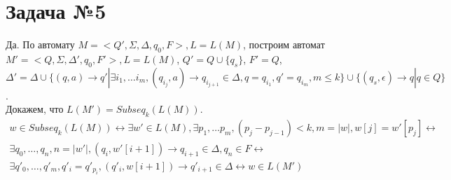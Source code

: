 \documentclass{article}
\begin{document}
     \section{Задача №5}
     Да. По автомату $M = <Q', \Sigma, \Delta, q_0, F>, L = L(M)$, построим автомат
     $M' = <Q, \Sigma, \Delta', q_0, F'>, L = L(M)$, 
     $Q' = Q \cup \{ q_s \}$,
     $F' = Q$,\\
     $\Delta' = \Delta \cup \{ (q, a) \rightarrow q' |
      \exists i_1, \ldots i_m, (q_{i_j}, a) \rightarrow q_{i_{j + 1}} \in \Delta,
       q = q_{i_1}, q' = q_{i_m}, m \leq k \} \cup \{ (q_s, \epsilon) \rightarrow q| q \in Q \} $.\\
     Докажем, что $L(M') = Subseq_k(L(M))$.\\
     \begin{multline}
     w \in Subseq_k(L(M)) \leftrightarrow \exists w' \in L(M), \exists p_1, \ldots p_m, (p_j - p_{j - 1}) < k, m = |w|, 
     w[j] = w'[p_j] \leftrightarrow \\
     \exists q_0, \ldots, q_n, n = |w'|, (q_i, w'[i + 1]) \rightarrow q_{i+1} \in \Delta, q_n \in F \leftrightarrow \\
     \exists q'_0, \ldots, q'_m, q'_i = q'_{p_i}, (q'_i, w[i + 1]) \rightarrow q'_{i+1} \in \Delta \leftrightarrow 
     w \in L(M')
     \end{multline}
\end{document}

